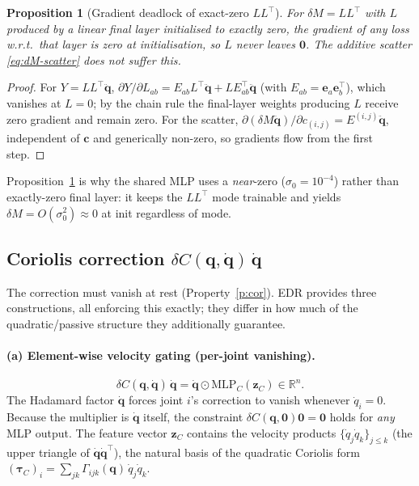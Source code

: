 \documentclass[11pt]{article}
\newcommand{\R}{\mathbb{R}}
\newcommand{\q}{\bm{q}}
\newcommand{\qd}{\dot{\bm{q}}}
\newcommand{\qdd}{\ddot{\bm{q}}}
\newcommand{\tC}{\bm{\tau}_C}
\newcommand{\dM}{\delta\!M}
\newcommand{\dC}{\delta C}
\newcommand{\MLP}{\mathrm{MLP}}
\newcommand{\transp}{^{\top}}
\theoremstyle{definition}
\theoremstyle{plain}
\newtheorem{proposition}{Proposition}
\begin{document}
\begin{proposition}[Gradient deadlock of exact-zero $LL\transp$]\label{prop:deadlock}
For $\dM=LL\transp$ with $L$ produced by a linear final layer initialised to
exactly zero, the gradient of any loss w.r.t.\ that layer is zero at
initialisation, so $L$ never leaves $\bm 0$. The additive scatter
\eqref{eq:dM-scatter} does not suffer this.
\end{proposition}
\begin{proof}
For $Y=LL\transp\qdd$, $\partial Y/\partial L_{ab}=E_{ab}L\transp\qdd+L E_{ab}\transp\qdd$
(with $E_{ab}=\bm e_a\bm e_b\transp$), which vanishes at $L=0$; by the chain rule
the final-layer weights producing $L$ receive zero gradient and remain zero.
For the scatter, $\partial(\dM\qdd)/\partial c_{(i,j)}=E^{(i,j)}\qdd$, independent
of $\bm c$ and generically non-zero, so gradients flow from the first step.
\end{proof}
Proposition~\ref{prop:deadlock} is why the shared MLP uses a \emph{near}-zero
($\sigma_0=10^{-4}$) rather than exactly-zero final layer: it keeps the $LL\transp$
mode trainable and yields $\dM=O(\sigma_0^2)\approx0$ at init regardless of mode.

\subsection{Coriolis correction \texorpdfstring{$\dC(\q,\qd)\,\qd$}{dC(q,qdot) qdot}}
\label{sec:coriolis}
The correction must vanish at rest (Property~\ref{p:cor}). EDR provides three
constructions, all enforcing this exactly; they differ in how much of the
quadratic/passive structure they additionally guarantee.

\paragraph{(a) Element-wise velocity gating (per-joint vanishing).}
\begin{equation}
\dC(\q,\qd)\,\qd=\qd\odot\MLP_C(\bm z_C)\in\R^{n}.
\label{eq:cor-elem}
\end{equation}
The Hadamard factor $\qd$ forces joint $i$'s correction to vanish whenever
$\dot q_i=0$. Because the multiplier is $\qd$ itself, the constraint
$\dC(\q,\bm 0)\bm 0=\bm 0$ holds for \emph{any} MLP output. The feature vector
$\bm z_C$ contains the velocity products $\{\dot q_j\dot q_k\}_{j\le k}$ (the upper
triangle of $\qd\qd\transp$), the natural basis of the quadratic Coriolis form
$(\tC)_i=\sum_{jk}\Gamma_{ijk}(\q)\,\dot q_j\dot q_k$.
\end{document}
